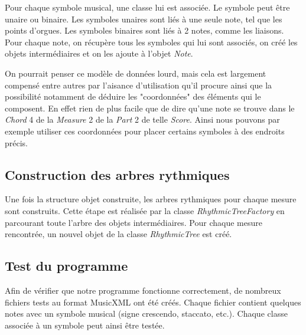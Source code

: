 \par
Pour chaque symbole musical, une classe lui est associée. Le symbole peut être unaire ou binaire.
Les symboles unaires sont liés à une seule note, tel que les points d'orgues. Les symboles binaires
sont liés à 2 notes, comme les liaisons. Pour chaque note, on récupère tous les symboles qui lui 
sont associés, on créé les objets intermédiaires et on les ajoute à l'objet \emph{Note}.


\par
On pourrait penser ce modèle de données lourd, mais cela est largement compensé entre autres
par l'aisance d'utilisation qu'il procure ainsi que la possibilité notamment de déduire les
"coordonnées" des éléments qui le composent. En effet rien de plus facile que de dire
qu'une note se trouve dans le \emph{Chord} 4 de la \emph{Measure} 2 de la \emph{Part}
2 de telle \emph{Score}. Ainsi nous pouvons par exemple utiliser ces coordonnées pour
placer certains symboles à des endroits précis.


\subsection{Construction des arbres rythmiques}

Une fois la structure objet construite, les arbres rythmiques pour chaque mesure sont construits.
Cette étape est réalisée par la classe \emph{RhythmicTreeFactory} en parcourant toute l'arbre des objets intermédiaires.
Pour chaque mesure rencontrée, un nouvel objet de la classe \emph{RhythmicTree} est créé.


\subsection{Test du programme}

Afin de vérifier que notre programme fonctionne correctement, de nombreux fichiers tests au format MusicXML ont été créés.
Chaque fichier contient quelques notes avec un symbole musical (signe crescendo, staccato, etc.). Chaque classe associée 
à un symbole peut ainsi être testée.
